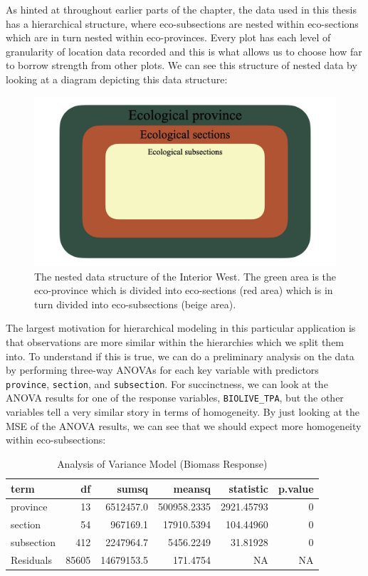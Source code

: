 \documentclass[12pt,twoside]{reedthesis}
\begin{document}
As hinted at throughout earlier parts of the chapter, the data used in this thesis has a hierarchical structure, where eco-subsections are nested within eco-sections which are in turn nested within eco-provinces. Every plot has each level of granularity of location data recorded and this is what allows us to choose how far to borrow strength from other plots. We can see this structure of nested data by looking at a diagram depicting this data structure:
\begin{figure}

{\centering \includegraphics[width=1\linewidth]{figure/data-structure} 

}

\caption[The nested data structure of the Interior West]{The nested data structure of the Interior West. The green area is the eco-province which is divided into eco-sections (red area) which is in turn divided into eco-subsections (beige area).}\label{fig:unnamed-chunk-9}
\end{figure}
The largest motivation for hierarchical modeling in this particular application is that observations are more similar within the hierarchies which we split them into. To understand if this is true, we can do a preliminary analysis on the data by performing three-way ANOVAs for each key variable with predictors \texttt{province}, \texttt{section}, and \texttt{subsection}. For succinctness, we can look at the ANOVA results for one of the response variables, \texttt{BIOLIVE\_TPA}, but the other variables tell a very similar story in terms of homogeneity. By just looking at the MSE of the ANOVA results, we can see that we should expect more homogeneity within eco-subsections:
\begin{longtable}[t]{lrrrrr}
\caption{\label{tab:unnamed-chunk-10}Analysis of Variance Model (Biomass Response)}\\
\toprule
term & df & sumsq & meansq & statistic & p.value\\
\midrule
province & 13 & 6512457.0 & 500958.2335 & 2921.45793 & 0\\
section & 54 & 967169.1 & 17910.5394 & 104.44960 & 0\\
subsection & 412 & 2247964.7 & 5456.2249 & 31.81928 & 0\\
Residuals & 85605 & 14679153.5 & 171.4754 & NA & NA\\
\bottomrule
\end{longtable}
\end{document}
